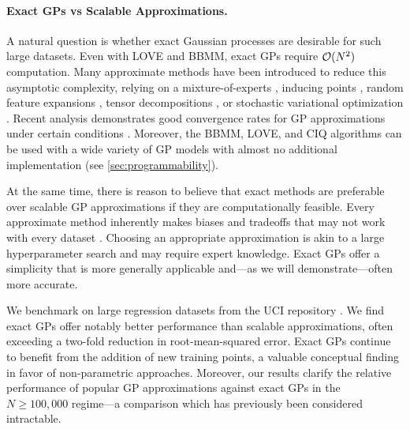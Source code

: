 \paragraph{Exact GPs vs Scalable Approximations.}
A natural question is whether exact Gaussian processes are desirable for such large datasets.
Even with LOVE and BBMM, exact GPs require $\bigo{N^2}$ computation.
Many approximate methods have been introduced to reduce this asymptotic complexity, relying on a mixture-of-experts \cite{deisenroth2015distributed}, inducing points \citep{snelson2006sparse,titsias2009variational,wilson2015kernel,gardner2018product},
random feature expansions \cite{rahimi2008random,le2013fastfood,yang2015carte},
tensor decompositions \cite{izmailov2018scalable,evans2018scalable},
or stochastic variational optimization \citep{hensman2013gaussian,hensman2015scalable,wilson2016stochastic,cheng2017variational,salimbeni2018orthogonally,shi2019sparse}.
Recent analysis demonstrates good convergence rates for GP approximations under certain conditions \cite{burt2019rates}.
Moreover, the BBMM, LOVE, and CIQ algorithms can be used with a wide variety of GP models with almost no additional implementation (see \cref{sec:programmability}).

At the same time, there is reason to believe that exact methods are preferable over scalable GP approximations if they are computationally feasible.
Every approximate method inherently makes biases and tradeoffs that may not work with every dataset \cite{turner2011two,bauer2016understanding}.
Choosing an appropriate approximation is akin to a large hyperparameter search and may require expert knowledge.
Exact GPs offer a simplicity that is more generally applicable and---as we will demonstrate---often more accurate.

We benchmark on large regression datasets from the UCI repository \citep{asuncion2007uci}.
We find exact GPs offer notably better performance than scalable approximations, often exceeding a two-fold reduction in root-mean-squared error.
Exact GPs continue to benefit from the addition of new training points, a valuable conceptual finding in favor of non-parametric approaches.
Moreover, our results clarify the relative performance of popular GP approximations against exact GPs in the $N\geq100,\!000$ regime---a comparison which has previously been considered intractable.

